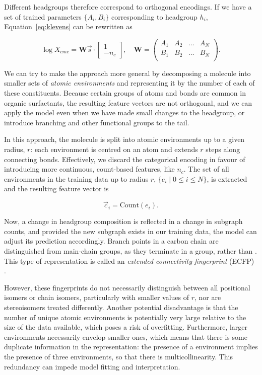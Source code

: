 Different headgroups therefore correspond to orthogonal encodings. If we have a
set of trained parameters $\{A_i, B_i\}$ corresponding to headgroup $h_i$,
Equation~\ref{eq:klevens} can be rewritten as

\begin{equation}
    \log X_{cmc} = \mathbf{W}\vec{s} \cdot \begin{bmatrix}
        1 \\ -n_c
    \end{bmatrix},\quad \mathbf{W} = \begin{pmatrix}
        A_1 & A_2 & \dots  & A_N\\
        B_1 & B_2 & \dots & B_N\\
    \end{pmatrix}.
\end{equation}

We can try to make the approach more general by decomposing a molecule into
smaller sets of \emph{atomic environments} and representing it by the number of
each of these constituents. Because certain groups of atoms and bonds are common
in organic surfactants, the resulting feature vectors are not orthogonal, and we
can apply the model even when we have made small changes to the headgroup, or
introduce branching and other functional groups to the tail.

In this approach, the molecule is split into atomic environments up to a given
radius, $r$: each environment is centred on an atom and extends $r$ steps along
connecting bonds. Effectively, we discard the categorical encoding in favour of
introducing more continuous, count-based features, like $n_c$. The set of all
environments in the training data up to radius $r$, $\{e_i \mid 0 \leq i \leq
N\}$, is extracted and the resulting feature vector is

\begin{equation}
    \vec{c}_i = \text{Count}(e_i).
\end{equation}

Now, a change in headgroup composition is reflected in a change in subgraph
counts, and provided the new subgraph exists in our training data, the model can
adjust its prediction accordingly. Branch points in a carbon chain are
distinguished from main-chain groups, as they terminate in a  group,
rather than . This type of representation is called an
\emph{extended-connectivity fingerprint} (ECFP)
\cite{rogersExtendedConnectivityFingerprints2010}.

However, these fingerprints do not necessarily distinguish between all
positional isomers or chain isomers, particularly with smaller values of $r$,
nor are stereoisomers treated differently. Another potential disadvantage is
that the number of unique atomic environments is potentially very large relative
to the size of the data available, which poses a risk of overfitting.
Furthermore, larger environments necessarily envelop smaller ones, which means
that there is some duplicate information in the representation: the presence of
a  environment implies the presence of three  environments,
so that there is multicollinearity. This redundancy can impede model fitting and
interpretation.

